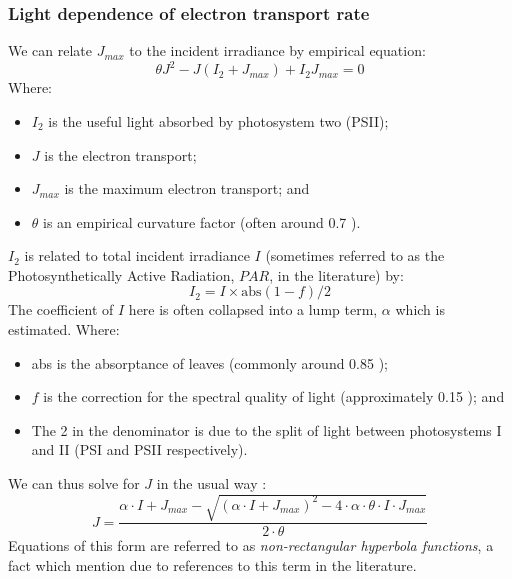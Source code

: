 \documentclass[11pt]{article} %
\begin{document}
\subsubsection{Light dependence of electron transport rate}
We can relate $J_{max}$ to the incident irradiance by empirical equation:
\begin{equation} \label{J_J_max_relationship}
 \theta J^2 - J\left (I_2 + J_{max}\right ) + I_2J_{max} = 0
\end{equation}
Where:
\begin{itemize}
 \item $I_2$ is the useful light absorbed by photosystem two (PSII);
 \item $J$ is the electron transport;
 \item $J_{max}$ is the maximum electron transport; and
 \item $\theta$ is an empirical curvature factor (often around 0.7 \cite{EvansPhotosynthesisnitrogenrelationships1989}).
\end{itemize}
$I_2$ is related to total incident irradiance $I$ (sometimes referred to as the Photosynthetically Active Radiation, $PAR$, in the literature) by:
\begin{equation} \label{I_2_def}
I_2 = I \times \textrm{abs}(1-f)/2
\end{equation}
The coefficient of $I$ here is often collapsed into a lump term, $\alpha$ which is estimated. 
Where:
\begin{itemize}
 \item abs is the absorptance of leaves (commonly around 0.85 \cite{CaemmererBiochemicalmodelsleaf2000});
 \item $f$ is the correction for the spectral quality of light (approximately 0.15 \cite{EvansDependenceQuantumYield1987}); and
 \item The 2 in the denominator is due to the split of light between photosystems I and II (PSI and PSII respectively).
\end{itemize}
We can thus solve for $J$ in the usual way \cite{QianEstimationphotosynthesisparameters2012}\cite{YinC3C4photosynthesis2009}:
\begin{equation} \label{nonrectangular_hyperbola}
J = \frac{\alpha \cdot I + J_{max} - \sqrt{\left (\alpha \cdot I + J_{max}\right )^2 - 4 \cdot \alpha \cdot \theta \cdot I \cdot J_{max}}}{2  \cdot\theta}
\end{equation}
Equations of this form are referred to as \emph{non-rectangular hyperbola functions}, a fact which mention due to references to this term in the literature.
\end{document}
